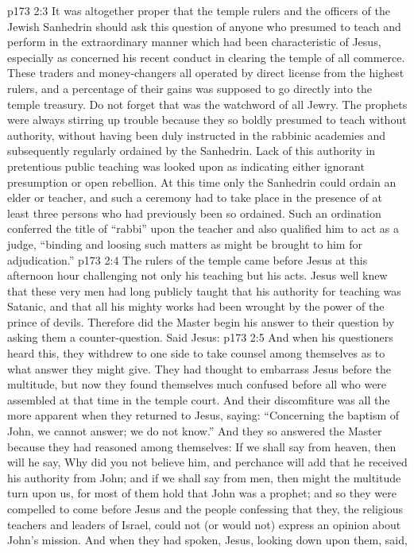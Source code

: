 \vs p173 2:3 It was altogether proper that the temple rulers and the officers of the Jewish Sanhedrin should ask this question of anyone who presumed to teach and perform in the extraordinary manner which had been characteristic of Jesus, especially as concerned his recent conduct in clearing the temple of all commerce. These traders and money\hyp{}changers all operated by direct license from the highest rulers, and a percentage of their gains was supposed to go directly into the temple treasury. Do not forget that  was the watchword of all Jewry. The prophets were always stirring up trouble because they so boldly presumed to teach without authority, without having been duly instructed in the rabbinic academies and subsequently regularly ordained by the Sanhedrin. Lack of this authority in pretentious public teaching was looked upon as indicating either ignorant presumption or open rebellion. At this time only the Sanhedrin could ordain an elder or teacher, and such a ceremony had to take place in the presence of at least three persons who had previously been so ordained. Such an ordination conferred the title of “rabbi” upon the teacher and also qualified him to act as a judge, “binding and loosing such matters as might be brought to him for adjudication.”
\vs p173 2:4 The rulers of the temple came before Jesus at this afternoon hour challenging not only his teaching but his acts. Jesus well knew that these very men had long publicly taught that his authority for teaching was Satanic, and that all his mighty works had been wrought by the power of the prince of devils. Therefore did the Master begin his answer to their question by asking them a counter\hyp{}question. Said Jesus: 
\vs p173 2:5 And when his questioners heard this, they withdrew to one side to take counsel among themselves as to what answer they might give. They had thought to embarrass Jesus before the multitude, but now they found themselves much confused before all who were assembled at that time in the temple court. And their discomfiture was all the more apparent when they returned to Jesus, saying: “Concerning the baptism of John, we cannot answer; we do not know.” And they so answered the Master because they had reasoned among themselves: If we shall say from heaven, then will he say, Why did you not believe him, and perchance will add that he received his authority from John; and if we shall say from men, then might the multitude turn upon us, for most of them hold that John was a prophet; and so they were compelled to come before Jesus and the people confessing that they, the religious teachers and leaders of Israel, could not (or would not) express an opinion about John’s mission. And when they had spoken, Jesus, looking down upon them, said, 
